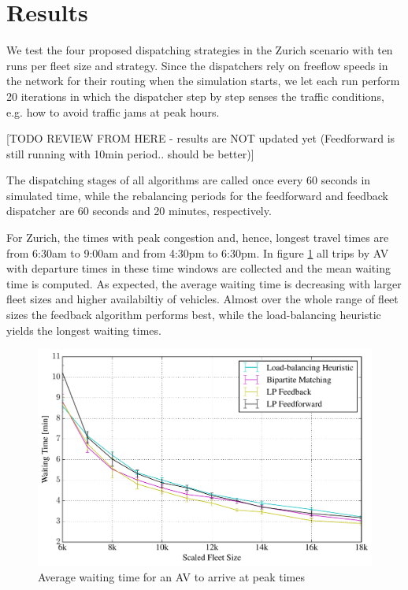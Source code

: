 \section{Results}
\label{sec:results}

We test the four proposed dispatching strategies in the Zurich scenario with ten
runs per fleet size and strategy. Since the dispatchers rely on freeflow speeds in the network
for their routing when the simulation starts, we let each run perform 20 iterations
in which the dispatcher step by step senses the traffic conditions, e.g. how to
avoid traffic jams at peak hours.

[TODO REVIEW FROM HERE - results are NOT updated yet (Feedforward is still running with 10min period.. should be better)]

The dispatching stages of all algorithms are called once every 60 seconds in
simulated time, while the rebalancing periods for the feedforward and feedback
dispatcher are 60 seconds and 20 minutes, respectively.

For Zurich, the times with peak congestion and, hence, longest travel times are
from 6:30am to 9:00am and from 4:30pm to 6:30pm. In figure \ref{fig:mean_peak_waiting_times}
all trips by AV with departure times in these time windows are collected
and the mean waiting time is computed. As expected, the average
waiting time is decreasing with larger fleet sizes and higher availabiltiy of
vehicles. Almost over the whole range of fleet sizes the feedback algorithm
performs best, while the load-balancing heuristic yields the longest waiting
times.

\begin{figure}
\includegraphics[width=1.0\textwidth]{figures/mean_peak_waiting_times.pdf}
\caption{Average waiting time for an AV to arrive at peak times}
\label{fig:mean_peak_waiting_times}
\end{figure}

